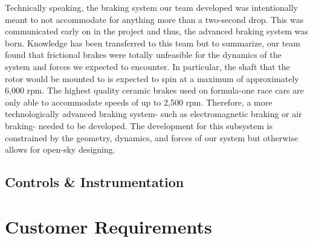 Technically speaking, the braking system our team developed was intentionally meant to not accommodate for anything more than a two-second drop. This was communicated early on in the project and thus, the advanced braking system was born. Knowledge has been transferred to this team but to summarize, our team found that frictional brakes were totally unfeasible for the dynamics of the system and forces we expected to encounter. In particular, the shaft that the rotor would be mounted to is expected to spin at a maximum of approximately 6,000 rpm. The highest quality ceramic brakes used on formula-one race cars are only able to accommodate speeds of up to 2,500 rpm. Therefore, a more technologically advanced braking system- such as electromagnetic braking or air braking- needed to be developed. The development for this subsystem is constrained by the geometry, dynamics, and forces of our system but otherwise allows for open-sky designing. 


\subsection{Controls \& Instrumentation}










\appendix

\section{\label{customer_reqs}Customer Requirements}

